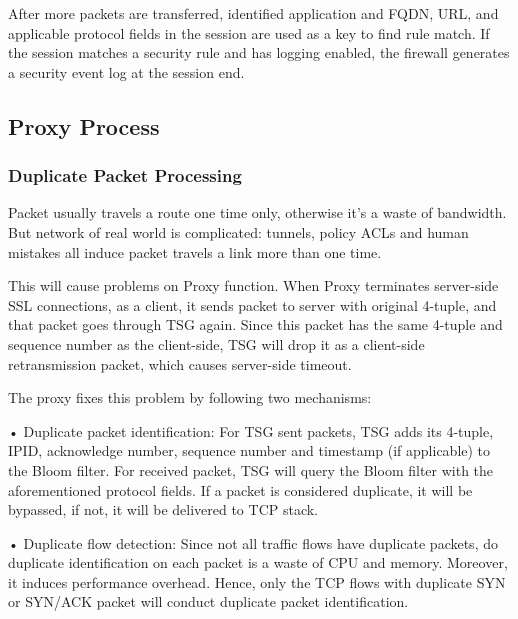 After more packets are transferred, identified application and FQDN, URL, and applicable protocol fields in the session are used as a key to find rule match. 
If the session matches a security rule and has logging enabled, the firewall generates a security event log at the session end.


\subsection*{\hypertarget{link:Proxy Process}{Proxy Process}}
\label{sec:appendix_e:sequence:proxy}

\subsubsection*{\hypertarget{link:Duplicate Packet Processing}{Duplicate Packet Processing}}
\label{sec:appendix_e:sequence:proxy:duplicate}

Packet usually travels a route one time only, otherwise it’s a waste of bandwidth. But network of real world is complicated: tunnels, policy ACLs and human mistakes all induce packet travels a link more than one time.


This will cause problems on Proxy function. When Proxy terminates server-side SSL connections, as a client, it sends packet to server with original 4-tuple, and that packet goes through TSG again. Since this packet has the same 4-tuple and sequence number as the client-side, TSG will drop it as a client-side retransmission packet, which causes server-side timeout.


The proxy fixes this problem by following two mechanisms:


• Duplicate packet identification: For TSG sent packets, TSG adds its 4-tuple, IPID, acknowledge number, sequence number and timestamp (if applicable) to the Bloom filter. For received packet, TSG will query the Bloom filter with the aforementioned protocol fields. If a packet is considered duplicate, it will be bypassed, if not, it will be delivered to TCP stack.


• Duplicate flow detection: Since not all traffic flows have duplicate packets, do duplicate identification on each packet is a waste of CPU and memory. 
Moreover, it induces performance overhead. Hence, only the TCP flows with duplicate SYN or SYN/ACK packet will conduct duplicate packet identification. 


